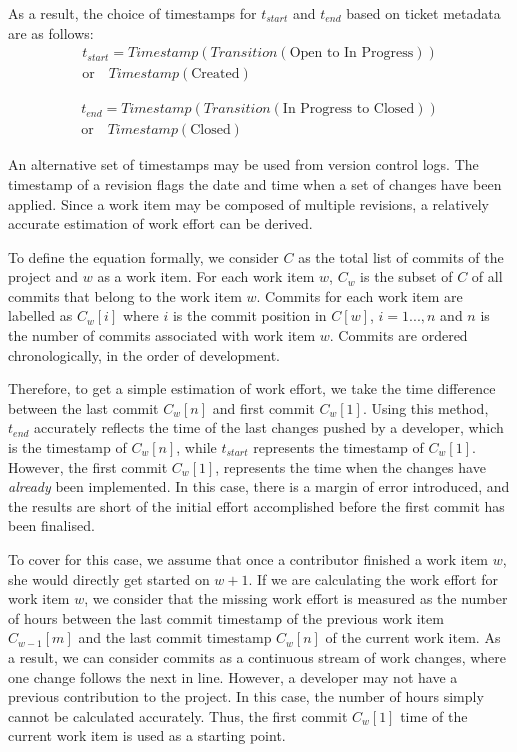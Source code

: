 \documentclass{mpaper}
\begin{document}
As a result, the choice of timestamps for $t_{start}$ and $t_{end}$ based on
ticket metadata are as follows:
\begin{equation}
  \label{eq-ticket-start}
  \begin{aligned}
    t_{start} = Timestamp(Transition(\textrm{Open to In Progress})) \\ 
      \textrm{or} \quad Timestamp(\textrm{Created})
  \end{aligned}
\end{equation}

\begin{equation}
  \label{eq-ticket-closed}
  \begin{aligned}
    t_{end} = Timestamp(Transition(\textrm{In Progress to Closed})) \\ 
      \textrm{or} \quad Timestamp(\textrm{Closed})    
  \end{aligned}
\end{equation}

An alternative set of timestamps may be used from version control logs. The
timestamp of a revision flags the date and time when a set of changes have been
applied. Since a work item may be composed of multiple revisions, a relatively
accurate estimation of work effort can be derived. 

To define the equation formally, we consider $C$ as the total list of commits of
the project and $w$ as a work item. For each work item $w$, $C_{w}$ is the
subset of $C$ of all commits that belong to the work item $w$. Commits for each
work item are labelled as $C_{w}[i]$ where $i$ is the commit position in $C[w]$,
$i=1...,n$ and $n$ is the number of commits associated with work item $w$.
Commits are ordered chronologically, in the order of development.

Therefore, to get a simple estimation of work effort, we take the time difference
between the last commit $C_{w}[n]$ and first commit $C_{w}[1]$. Using this
method, $t_{end}$ accurately reflects the time of the last changes pushed by a
developer, which is the timestamp of $C_{w}[n]$, while $t_{start}$ represents
the timestamp of $C_{w}[1]$. However, the first commit $C_{w}[1]$, represents
the time when the changes have \emph{already} been implemented. In this case,
there is a margin of error introduced, and the results are short of the
initial effort accomplished before the first commit has been finalised.

To cover for this case, we assume that once a contributor finished a work item
$w$, she would directly get started on $w+1$. If we are calculating the work
effort for work item $w$, we consider that the missing work effort is measured
as the number of hours between the last commit timestamp of the previous work
item $C_{w-1}[m]$ and the last commit timestamp $C_{w}[n]$ of the current work
item. As a result, we can consider commits as a continuous stream of work
changes, where one change follows the next in line. However, a developer may not
have a previous contribution to the project. In this case, the number of hours
simply cannot be calculated accurately. Thus, the first commit $C_{w}[1]$ time
of the current work item is used as a starting point.
\end{document}
